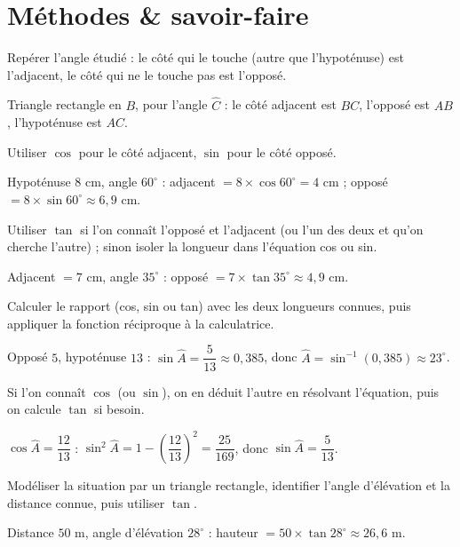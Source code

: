\section{Méthodes \& savoir-faire}

Repérer l'angle étudié : le côté qui le touche (autre que l'hypoténuse) est l'adjacent, le
côté qui ne le touche pas est l'opposé.
\begin{exemple}
Triangle rectangle en $B$, pour l'angle $\widehat C$ : le côté adjacent est $BC$, l'opposé
est $AB$, l'hypoténuse est $AC$.
\end{exemple}

Utiliser $\cos$ pour le côté adjacent, $\sin$ pour le côté opposé.
\begin{exemple}
Hypoténuse $8$ cm, angle $60^{\circ}$ : adjacent $=8\times\cos60^{\circ}=4$ cm ; opposé
$=8\times\sin60^{\circ}\approx6{,}9$ cm.
\end{exemple}

Utiliser $\tan$ si l'on connaît l'opposé et l'adjacent (ou l'un des deux et qu'on cherche
l'autre) ; sinon isoler la longueur dans l'équation cos ou sin.
\begin{exemple}
Adjacent $=7$ cm, angle $35^{\circ}$ : opposé $=7\times\tan35^{\circ}\approx4{,}9$ cm.
\end{exemple}

Calculer le rapport (cos, sin ou tan) avec les deux longueurs connues, puis appliquer la
fonction réciproque à la calculatrice.
\begin{exemple}
Opposé $5$, hypoténuse $13$ : $\sin\widehat A=\dfrac5{13}\approx0{,}385$, donc
$\widehat A=\sin^{-1}(0{,}385)\approx23^{\circ}$.
\end{exemple}

Si l'on connaît $\cos$ (ou $\sin$), on en déduit l'autre en résolvant l'équation, puis on
calcule $\tan$ si besoin.
\begin{exemple}
$\cos\widehat A=\dfrac{12}{13}$ : $\sin^{2}\widehat A=1-\left(\dfrac{12}{13}\right)^{2}=\dfrac{25}{169}$,
donc $\sin\widehat A=\dfrac5{13}$.
\end{exemple}

Modéliser la situation par un triangle rectangle, identifier l'angle d'élévation et la
distance connue, puis utiliser $\tan$.
\begin{exemple}
Distance $50$ m, angle d'élévation $28^{\circ}$ : hauteur $=50\times\tan28^{\circ}\approx26{,}6$ m.
\end{exemple}

